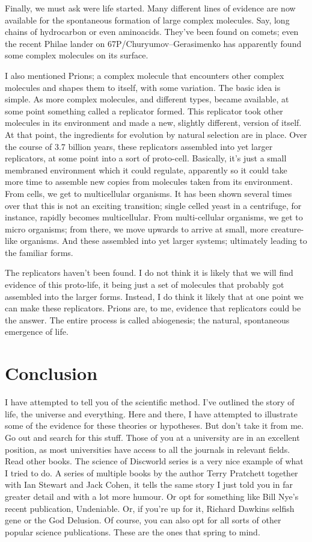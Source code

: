\begin{multicols}{2}
Finally, we must ask were life started. Many different lines of evidence are now available for the spontaneous formation of large complex molecules. Say, long chains of hydrocarbon or even aminoacids. They've been found on comets; even the recent Philae lander on 67P/Churyumov–Gerasimenko has apparently found some complex molecules on its surface.

I also mentioned Prions; a complex molecule that encounters other complex molecules and shapes them to itself, with some variation. The basic idea is simple. As more complex molecules, and different types, became available, at some point something called a replicator formed. This replicator took other molecules in its environment and made a new, slightly different, version of itself. At that point, the ingredients for evolution by natural selection are in place. Over the course of 3.7 billion years, these replicators assembled into yet larger replicators, at some point into a sort of proto-cell. Basically, it's just a small membraned environment which it could regulate, apparently so it could take more time to assemble new copies from molecules taken from its environment. From cells, we get to multicellular organisms. It has been shown several times over that this is not an exciting transition; single celled yeast in a centrifuge, for instance, rapidly becomes multicellular. From multi-cellular organisms, we get to micro organisms; from there, we move upwards to arrive at small, more creature-like organisms. And these assembled into yet larger systems; ultimately leading to the familiar forms.

The replicators haven't been found. I do not think it is likely that we will find evidence of this proto-life, it being just a set of molecules that probably got assembled into the larger forms. Instead, I do think it likely that at one point we can make these replicators. Prions are, to me, evidence that replicators could be the answer. The entire process is called abiogenesis; the natural, spontaneous emergence of life.

\section{Conclusion}
I have attempted to tell you of the scientific method. I've outlined the story of life, the universe and everything. Here and there, I have attempted to illustrate some of the evidence for these theories or hypotheses. But don't take it from me. Go out and search for this stuff. Those of you at a university are in an excellent position, as most universities have access to all the journals in relevant fields. Read other books. The science of Discworld series is a very nice example of what I tried to do. A series of multiple books by the author Terry Pratchett together with Ian Stewart and Jack Cohen, it tells the same story I just told you in far greater detail and with a lot more humour. Or opt for something like Bill Nye's recent publication, Undeniable. Or, if you're up for it, Richard Dawkins selfish gene or the God Delusion. Of course, you can also opt for all sorts of other popular science publications. These are the ones that spring to mind.
\end{multicols}